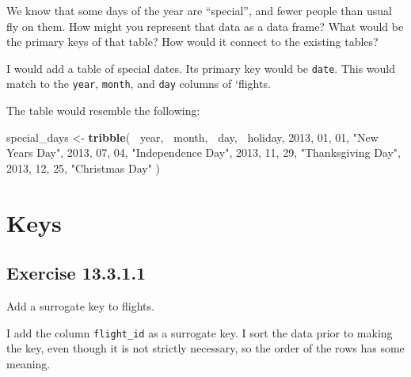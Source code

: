 \documentclass[]{book}
\newenvironment{Shaded}{\begin{snugshade}}{\end{snugshade}}
\newcommand{\DecValTok}[1]{\textcolor[rgb]{0.00,0.00,0.81}{#1}}
\newcommand{\KeywordTok}[1]{\textcolor[rgb]{0.13,0.29,0.53}{\textbf{#1}}}
\newcommand{\NormalTok}[1]{#1}
\newcommand{\OperatorTok}[1]{\textcolor[rgb]{0.81,0.36,0.00}{\textbf{#1}}}
\newcommand{\StringTok}[1]{\textcolor[rgb]{0.31,0.60,0.02}{#1}}
\theoremstyle{plain}
\theoremstyle{remark}
\begin{document}
We know that some days of the year are ``special'', and fewer people
than usual fly on them. How might you represent that data as a data
frame? What would be the primary keys of that table? How would it
connect to the existing tables?

I would add a table of special dates. Its primary key would be
\texttt{date}. This would match to the \texttt{year}, \texttt{month},
and \texttt{day} columns of `flights.

The table would resemble the following:

\begin{Shaded}
\begin{Highlighting}[]
\NormalTok{special_days <-}\StringTok{ }\KeywordTok{tribble}\NormalTok{(}
  \OperatorTok{~}\NormalTok{year, }\OperatorTok{~}\NormalTok{month, }\OperatorTok{~}\NormalTok{day, }\OperatorTok{~}\NormalTok{holiday,}
  \DecValTok{2013}\NormalTok{, }\DecValTok{01}\NormalTok{, }\DecValTok{01}\NormalTok{, }\StringTok{"New Years Day"}\NormalTok{,}
  \DecValTok{2013}\NormalTok{, }\DecValTok{07}\NormalTok{, }\DecValTok{04}\NormalTok{, }\StringTok{"Independence Day"}\NormalTok{,}
  \DecValTok{2013}\NormalTok{, }\DecValTok{11}\NormalTok{, }\DecValTok{29}\NormalTok{, }\StringTok{"Thanksgiving Day"}\NormalTok{,}
  \DecValTok{2013}\NormalTok{, }\DecValTok{12}\NormalTok{, }\DecValTok{25}\NormalTok{, }\StringTok{"Christmas Day"}
\NormalTok{)}
\end{Highlighting}
\end{Shaded}

\hypertarget{keys}{%
\section{Keys}\label{keys}}

\hypertarget{exercise-13.3.1.1}{%
\subsection*{\texorpdfstring{Exercise
{13.3.1.1}}{Exercise 13.3.1.1}}\label{exercise-13.3.1.1}}

Add a surrogate key to flights.

I add the column \texttt{flight\_id} as a surrogate key. I sort the data
prior to making the key, even though it is not strictly necessary, so
the order of the rows has some meaning.
\end{document}
